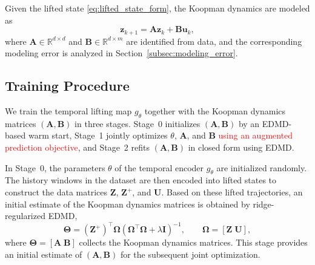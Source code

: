 \documentclass[journal]{IEEEtran}
\newcommand{\vu}{\mathbf{u}}
\newcommand{\vz}{\mathbf{z}}
\newcommand{\mA}{\mathbf{A}}
\newcommand{\mB}{\mathbf{B}}
\newcommand{\mZ}{\mathbf{Z}}
\newcommand{\mU}{\mathbf{U}}
\newcommand{\mI}{\mathbf{I}}
\newcommand{\mTheta}{\boldsymbol{\Theta}}
\newcommand{\mOmega}{\boldsymbol{\Omega}}
\begin{document}
Given the lifted state \eqref{eq:lifted_state_form}, the Koopman dynamics are modeled as
\begin{equation}
    \vz_{k+1} = \mA \vz_k + \mB \vu_k,
    \label{eq:temporal_dynamics}
\end{equation}
where $\mA \in \mathbb{R}^{d\times d}$ and $\mB \in \mathbb{R}^{d\times m}$ are identified from data, and the corresponding modeling error is analyzed in Section~\ref{subsec:modeling_error}.

\subsection{Training Procedure}
\label{sec:training}

We train the temporal lifting map $g_\theta$ together with the Koopman dynamics matrices $(\mA,\mB)$ in three stages. Stage~0 initializes $(\mA,\mB)$ by an EDMD-based warm start, Stage~1 jointly optimizes $\theta$, $\mA$, and $\mB$ \textcolor{red}{using an augmented prediction objective}, and Stage~2 refits $(\mA,\mB)$ in closed form using EDMD.

In Stage~0, the parameters $\theta$ of the temporal encoder $g_\theta$ are initialized randomly. The history windows in the dataset are then encoded into lifted states to construct the data matrices $\mZ$, $\mZ^{+}$, and $\mU$. Based on these lifted trajectories, an initial estimate of the Koopman dynamics matrices is obtained by ridge-regularized EDMD,
\begin{equation}
    \mTheta = (\mZ^{+})^\top \mOmega
    \left(\mOmega^\top \mOmega + \lambda \mI\right)^{-1},
    \qquad
    \mOmega = [\mZ\;\mU],
    \label{eq:edmd_solution}
\end{equation}
where $\mTheta = [\mA\;\mB]$ collects the Koopman dynamics matrices. This stage provides an initial estimate of $(\mA,\mB)$ for the subsequent joint optimization.
\end{document}
